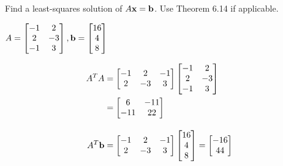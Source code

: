 \begin{exercise} %
	Find a least-squares solution of $A\boldsymbol{\mathbf{x}}=\boldsymbol{\mathbf{b}}$. Use Theorem 6.14 if applicable. \par
	$ A = \begin{bmatrix}-1&2\\2&-3\\-1&3\end{bmatrix}, 
	\boldsymbol{\mathbf{b}} = \begin{bmatrix}16\\4\\8\end{bmatrix} $
	
	\begin{multicols}{2}
	\begin{align*}
	A^TA &= \begin{bmatrix}-1&2&-1\\2&-3&3\end{bmatrix}
	\begin{bmatrix}-1&2\\2&-3\\-1 &3\end{bmatrix} \\
	&= \begin{bmatrix}6&-11\\-11&22\end{bmatrix} \\[1em]
	A^T\boldsymbol{\mathbf{b}} &= \begin{bmatrix}-1&2&-1\\2&-3&3\end{bmatrix} \begin{bmatrix}16\\4\\8\end{bmatrix} = \begin{bmatrix}-16\\44\end{bmatrix}
	\end{align*}
	
	\columnbreak
	\end{multicols}
\end{exercise}
\vfill


\newpage



